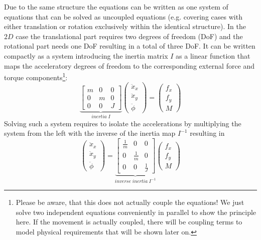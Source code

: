 Due to the same structure the equations can be written as one system of equations that can
be solved as uncoupled equations (e.g. covering cases with either translation or rotation
exclusively within the identical structure). In the $2D$ case the translational part
requires two degrees of freedom (DoF) and the rotational part needs one DoF resulting in a
total of three DoF. It can be written compactly as a system introducing the inertia matrix
$I$ as a linear function that maps the acceleratory degrees of freedom to the
corresponding external force and torque components\footnote{Please be aware, that this
does not actually couple the equations! We just solve two independent equations
conveniently in parallel to show the principle here. If the movement is actually coupled,
there will be coupling terms to model physical requirements that will be shown later on.}:
\begin{equation}
    \underbrace{
    \begin{bmatrix}
        m & 0 & 0 \\
        0 & m & 0 \\
        0 & 0 & J
    \end{bmatrix}
    }_{inertia \; I}
    \begin{pmatrix}
        \ddot{x}_x \\
        \ddot{x}_y \\
        \ddot{\phi} 
    \end{pmatrix}
    =
    \begin{pmatrix}
        {f}_x \\
        {f}_y \\
        {M} 
    \end{pmatrix} 
\end{equation}
Solving such a system requires to isolate the accelerations by multiplying the system from
the left with the inverse of the inertia map $I^{-1}$ resulting in
\begin{equation}
    \begin{pmatrix}
        \ddot{x}_x \\
        \ddot{x}_y \\
        \ddot{\phi} 
    \end{pmatrix}
    =
    \underbrace{
    \begin{bmatrix}
        \frac{1}{m} & 0           & 0 \\
        0           & \frac{1}{m} & 0 \\
        0           & 0           & \frac{1}{J}
    \end{bmatrix}
    }_{inverse \; inertia \; I^{-1}}
    \begin{pmatrix}
        {f}_x \\
        {f}_y \\
        {M} 
    \end{pmatrix} 
    \label{eq:classical_sys_Newton_Euler_2nd_order}
\end{equation}

